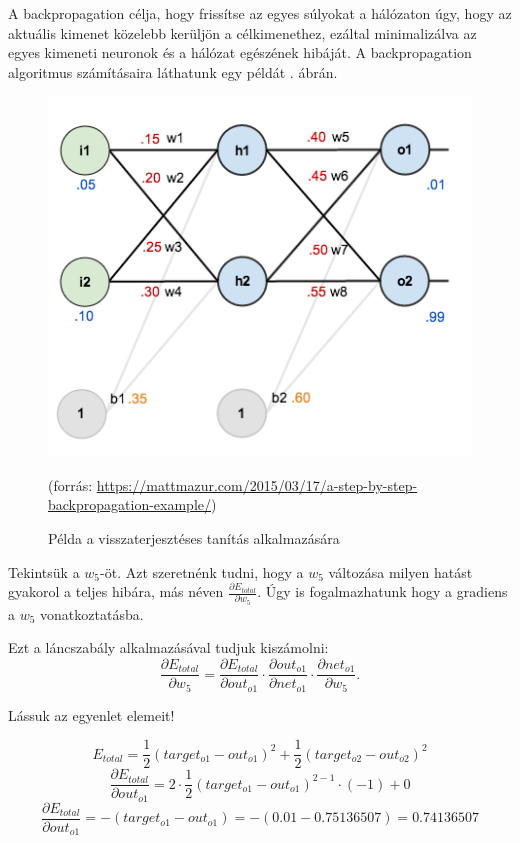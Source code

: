 A backpropagation célja, hogy frissítse az egyes súlyokat a hálózaton úgy, hogy az aktuális kimenet közelebb kerüljön a célkimenethez, ezáltal minimalizálva az egyes kimeneti neuronok és a hálózat egészének hibáját. A backpropagation algoritmus számításaira láthatunk egy példát . ábrán.

\begin{figure}[h]
\centering
\includegraphics[scale=0.5]{images/ANN_backprog}
\caption{Példa a visszaterjesztéses tanítás alkalmazására}
(forrás: \url{https://mattmazur.com/2015/03/17/a-step-by-step-backpropagation-example/})
\label{fig:ANN_backprog}
\end{figure}

Tekintsük a $w_5$-öt. Azt szeretnénk tudni, hogy a $w_5$ változása milyen hatást gyakorol a teljes hibára, más néven $\frac{\partial E_ {total}}{\partial w_ {5}}$. Úgy is fogalmazhatunk hogy a gradiens a $w_5$ vonatkoztatásba.

Ezt a láncszabály alkalmazásával tudjuk kiszámolni:
$$
\frac{\partial E_{total}}{\partial w_{5}} = \frac{\partial E_{total}}{\partial out_{o1}} \cdot \frac{\partial out_{o1}}{\partial net_{o1}} \cdot \frac{\partial net_{o1}}{\partial w_{5}}.
$$

Lássuk az egyenlet elemeit!
\begin{flushleft}
\begin{equation}
E_{total} = \frac{1}{2}(target_{o1} - out_{o1})^{2} + \frac{1}{2}(target_{o2} - out_{o2})^{2}
\end{equation}
\begin{equation}
\frac{\partial E_{total}}{\partial out_{o1}} = 2 \cdot \frac{1}{2}(target_{o1} - out_{o1})^{2 - 1} \cdot (-1) + 0
\end{equation}
\begin{equation}
\frac{\partial E_{total}}{\partial out_{o1}} = -(target_{o1} - out_{o1}) = -(0.01 - 0.75136507) = 0.74136507
\end{equation}

\end{flushleft}

